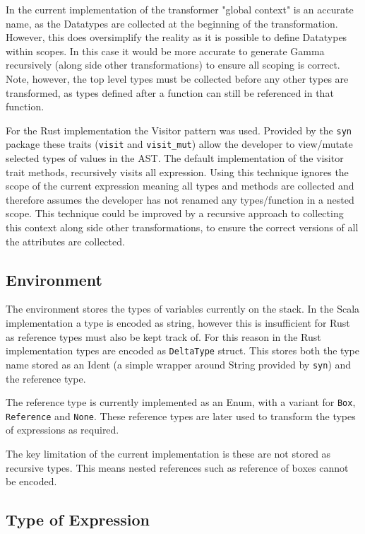 \documentclass[ oneside,%
                    author={James Elgar},
                    degree={MEng},
                     title={Bidirectional transformer between functional and \\ object-oriented programming in Rust},
                  subtitle={}]{dissertation}
\begin{document}
In the current implementation of the transformer "global context" is an accurate name, as the Datatypes are collected at the beginning of the transformation. However, this does oversimplify the reality as it is possible to define Datatypes within scopes. In this case it would be more accurate to generate Gamma recursively (along side other transformations) to ensure all scoping is correct. Note, however, the top level types must be collected before any other types are transformed, as types defined after a function can still be referenced in that function.

For the Rust implementation the Visitor pattern was used. Provided by the \verb|syn| package these traits (\verb|visit| and \verb|visit_mut|) allow the developer to view/mutate selected types of values in the AST. The default implementation of the visitor trait methods, recursively visits all expression. Using this technique ignores the scope of the current expression meaning all types and methods are collected and therefore assumes the developer has not renamed any types/function in a nested scope. This technique could be improved by a recursive approach to collecting this context along side other transformations, to ensure the correct versions of all the attributes are collected.

\subsection{Environment}

The environment stores the types of variables currently on the stack. 
In the Scala implementation a type is encoded as string, however this is insufficient for Rust as reference types must also be kept track of. For this reason in the Rust implementation types are encoded as \verb|DeltaType| struct. 
This stores both the type name stored as an Ident (a simple wrapper around String provided by \verb|syn|) and the reference type.

The reference type is currently implemented as an Enum, with a variant for \verb|Box|, \verb|Reference| and \verb|None|. These reference types are later used to transform the types of expressions as required.

The key limitation of the current implementation is these are not stored as recursive types. This means nested references such as reference of boxes cannot be encoded. 

\subsection{Type of Expression}
\end{document}
